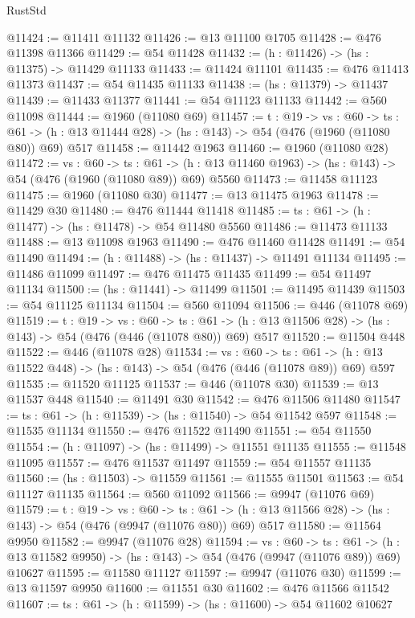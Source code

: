 \begin{lexlean}{RustStd}
\begin{coremodule}
@11424 := @11411 @11132
@11426 := @13 @11100 @1705
@11428 := @476 @11398 @11366
@11429 := @54 @11428
@11432 := (h : @11426) -> (hs : @11375) -> @11429 @11133
@11433 := @11424 @11101
@11435 := @476 @11413 @11373
@11437 := @54 @11435 @11133
@11438 := (hs : @11379) -> @11437
@11439 := @11433 @11377
@11441 := @54 @11123 @11133
@11442 := @560 @11098
@11444 := @1960 (@11080 @69)
@11457 := {t : @19} ->
  {vs : @60} ->
  {ts : @61} -> (h : @13 @11444 @28) -> (hs : @143) -> @54 (@476 (@1960 (@11080 @80)) @69) @517
@11458 := @11442 @1963
@11460 := @1960 (@11080 @28)
@11472 := {vs : @60} ->
  {ts : @61} -> (h : @13 @11460 @1963) -> (hs : @143) -> @54 (@476 (@1960 (@11080 @89)) @69) @5560
@11473 := @11458 @11123
@11475 := @1960 (@11080 @30)
@11477 := @13 @11475 @1963
@11478 := @11429 @30
@11480 := @476 @11444 @11418
@11485 := {ts : @61} -> (h : @11477) -> (hs : @11478) -> @54 @11480 @5560
@11486 := @11473 @11133
@11488 := @13 @11098 @1963
@11490 := @476 @11460 @11428
@11491 := @54 @11490
@11494 := (h : @11488) -> (hs : @11437) -> @11491 @11134
@11495 := @11486 @11099
@11497 := @476 @11475 @11435
@11499 := @54 @11497 @11134
@11500 := (hs : @11441) -> @11499
@11501 := @11495 @11439
@11503 := @54 @11125 @11134
@11504 := @560 @11094
@11506 := @446 (@11078 @69)
@11519 := {t : @19} ->
  {vs : @60} ->
  {ts : @61} -> (h : @13 @11506 @28) -> (hs : @143) -> @54 (@476 (@446 (@11078 @80)) @69) @517
@11520 := @11504 @448
@11522 := @446 (@11078 @28)
@11534 := {vs : @60} ->
  {ts : @61} -> (h : @13 @11522 @448) -> (hs : @143) -> @54 (@476 (@446 (@11078 @89)) @69) @597
@11535 := @11520 @11125
@11537 := @446 (@11078 @30)
@11539 := @13 @11537 @448
@11540 := @11491 @30
@11542 := @476 @11506 @11480
@11547 := {ts : @61} -> (h : @11539) -> (hs : @11540) -> @54 @11542 @597
@11548 := @11535 @11134
@11550 := @476 @11522 @11490
@11551 := @54 @11550
@11554 := (h : @11097) -> (hs : @11499) -> @11551 @11135
@11555 := @11548 @11095
@11557 := @476 @11537 @11497
@11559 := @54 @11557 @11135
@11560 := (hs : @11503) -> @11559
@11561 := @11555 @11501
@11563 := @54 @11127 @11135
@11564 := @560 @11092
@11566 := @9947 (@11076 @69)
@11579 := {t : @19} ->
  {vs : @60} ->
  {ts : @61} -> (h : @13 @11566 @28) -> (hs : @143) -> @54 (@476 (@9947 (@11076 @80)) @69) @517
@11580 := @11564 @9950
@11582 := @9947 (@11076 @28)
@11594 := {vs : @60} ->
  {ts : @61} -> (h : @13 @11582 @9950) -> (hs : @143) -> @54 (@476 (@9947 (@11076 @89)) @69) @10627
@11595 := @11580 @11127
@11597 := @9947 (@11076 @30)
@11599 := @13 @11597 @9950
@11600 := @11551 @30
@11602 := @476 @11566 @11542
@11607 := {ts : @61} -> (h : @11599) -> (hs : @11600) -> @54 @11602 @10627

\end{coremodule}
\end{lexlean}
